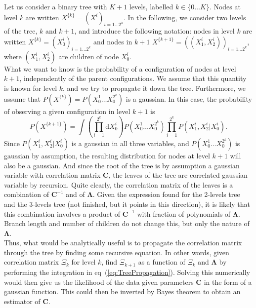 \documentclass[10pt]{article}
\newcommand{\ddroit}{\textrm{d}}
\newcommand{\Lam}{\bm{\Lambda}}
\newcommand{\Xk}[1]{X^{\{#1\}}}
\begin{document}
Let us consider a binary tree with $K+1$ levels, labelled $k\in\{0\ldots K\}$. Nodes at level $k$ are written $X^{\{k\}} = (X^i)_{i=1\ldots 2^k}$. In the following, we consider two levels of the tree, $k$ and $k+1$, and introduce the following notation: nodes in level $k$ are written $\Xk{k} = (X^i_0)_{i=1\ldots 2^k}$ and nodes in $k+1$ $\Xk{k+1} = \left((X^i_1, X^i_2)\right)_{i=1\ldots 2^{k}}$, where $(X^i_1, X^i_2)$ are children of node $X^i_0$. \\
What we want to know is the probability of a configuration of nodes at level $k+1$, independently of the parent configurations. We assume that this quantity is known for level $k$, and we try to propagate it down the tree. Furthermore, we assume that $P(\Xk{k}) = P(X^{1}_0\ldots X^{2^k}_0)$ is a gaussian. In this case, the probability of observing a given configuration in level $k+1$ is
\begin{equation}
  \label{eq:TreePropagation}
  P(\Xk{k+1}) = \int\left(\prod_{i=1}^{2^k}\ddroit X^{i}_0\right)P(X^{1}_0\ldots X^{2^k}_0)\prod_{i=1}^{2^k}P( X^{i}_1, X^{i}_2\vert X^{i}_0).
\end{equation}
Since $P( X^{i}_1, X^{i}_2\vert X^{i}_0)$ is a gaussian in all three variables, and $P(X^{1}_0\ldots X^{2^k}_0)$ is gaussian by assumption, the resulting distribution for nodes at level $k+1$ will also be a gaussian. And since the root of the tree is by assumption a gaussian variable with correlation matrix $\bm{C}$, the leaves of the tree are correlated gaussian variable by recursion. Quite clearly, the correlation matrix of the leaves is a combination of $\bm{C}^{-1}$ and of $\Lam$. Given the expression found for the 2-levels tree and the 3-levels tree (not finished, but it points in this direction), it is likely that this combination involves a product of $\bm{C}^{-1}$ with fraction of polynomials of $\Lam$. Branch length and number of children do not change this, but only the nature of $\Lam$.\\
Thus, what would be analytically useful is to propagate the correlation matrix through the tree by finding some recursive equation. In other words, given correlation matrix $\Xi_k$ for level $k$, find $\Xi_{k+1}$ as a function of $\Xi_k$ and $\Lam$ by performing the integration in eq~(\ref{eq:TreePropagation}). Solving this numerically would then give us the likelihood of the data given parameters $\bm{C}$ in the form of a gaussian function. This could then be inverted by Bayes theorem to obtain an estimator of $\bm{C}$.\\
\end{document}
